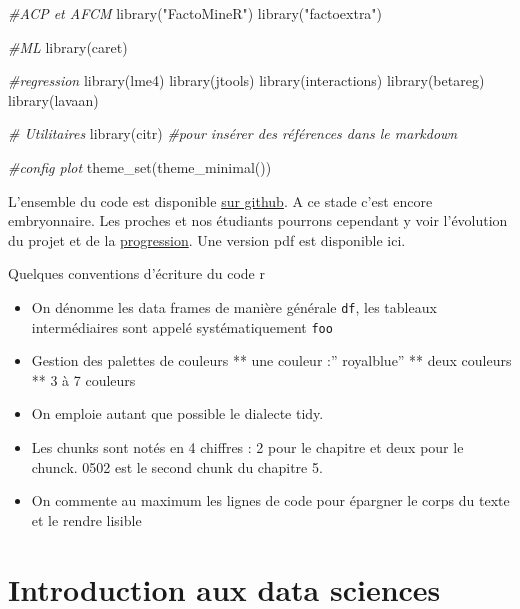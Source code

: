 \documentclass[
]{book}
\newenvironment{Shaded}{\begin{snugshade}}{\end{snugshade}}
\newcommand{\CommentTok}[1]{\textcolor[rgb]{0.56,0.35,0.01}{\textit{#1}}}
\newcommand{\FunctionTok}[1]{\textcolor[rgb]{0.00,0.00,0.00}{#1}}
\newcommand{\NormalTok}[1]{#1}
\newcommand{\StringTok}[1]{\textcolor[rgb]{0.31,0.60,0.02}{#1}}
\providecommand{\tightlist}{%
  \setlength{\itemsep}{0pt}\setlength{\parskip}{0pt}}
\begin{document}
\begin{Shaded}
\begin{Highlighting}[]
\CommentTok{\#ACP et AFCM}
\FunctionTok{library}\NormalTok{(}\StringTok{"FactoMineR"}\NormalTok{)}
\FunctionTok{library}\NormalTok{(}\StringTok{"factoextra"}\NormalTok{)}

\CommentTok{\#ML}
\FunctionTok{library}\NormalTok{(caret)}

\CommentTok{\#regression}
\FunctionTok{library}\NormalTok{(lme4)}
\FunctionTok{library}\NormalTok{(jtools)}
\FunctionTok{library}\NormalTok{(interactions)}
\FunctionTok{library}\NormalTok{(betareg)}
\FunctionTok{library}\NormalTok{(lavaan)}

\CommentTok{\# Utilitaires}
\FunctionTok{library}\NormalTok{(citr) }\CommentTok{\#pour insérer des références dans le markdown}

\CommentTok{\#config plot}
\FunctionTok{theme\_set}\NormalTok{(}\FunctionTok{theme\_minimal}\NormalTok{())}
\end{Highlighting}
\end{Shaded}

L'ensemble du code est disponible \href{https://github.com/BenaventC/Datasciences}{sur github}. A ce stade c'est encore embryonnaire. Les proches et nos étudiants pourrons cependant y voir l'évolution du projet et de la \href{https://benaventc.github.io/Datascience/}{progression}. Une version pdf est disponible ici.

Quelques conventions d'écriture du code r

\begin{itemize}
\tightlist
\item
  On dénomme les data frames de manière générale \texttt{df}, les tableaux intermédiaires sont appelé systématiquement \texttt{foo}
\item
  Gestion des palettes de couleurs
  ** une couleur :'' royalblue''
  ** deux couleurs
  ** 3 à 7 couleurs
\item
  On emploie autant que possible le dialecte tidy.
\item
  Les chunks sont notés en 4 chiffres : 2 pour le chapitre et deux pour le chunck. 0502 est le second chunk du chapitre 5.
\item
  On commente au maximum les lignes de code pour épargner le corps du texte et le rendre lisible
\end{itemize}

\hypertarget{intro}{%
\chapter{Introduction aux data sciences}\label{intro}}
\end{document}
